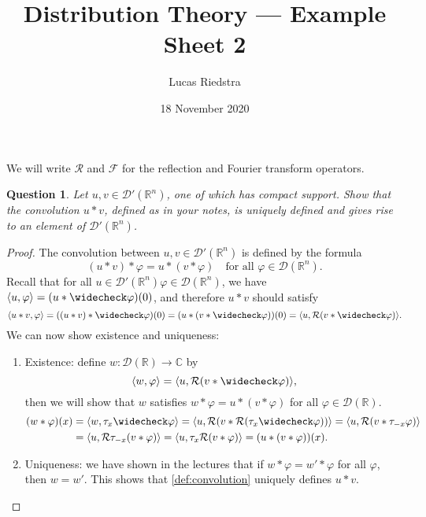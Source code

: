 \documentclass{article}
\title{Distribution Theory --- Example Sheet 2} %
\author{Lucas Riedstra}
\date{18 November 2020} %
\theoremstyle{plain}
\newtheorem{question}{Question}
\theoremstyle{remark}
\renewcommand{\phi}{\varphi}
\newcommand{\Bb}{\mathbb}
\newcommand{\Cal}{\mathcal}
\newcommand{\CC}{\Bb C}
\newcommand{\RR}{\Bb R}
\newcommand{\DD}{\Cal D}
\newcommand\FF{\Cal F}
\newcommand\Rr{\Cal R}
\DeclarePairedDelimiter{\ang}{\langle}{\rangle}
\newcommand\refl\widecheck
\begin{document}
\maketitle

\begin{mdframed}
	We will write $\Rr$ and $\FF$ for the reflection and Fourier transform operators. 
\end{mdframed}
\begin{question}
Let $u, v \in \DD'(\RR^n)$, one of which has compact support. Show that the convolution $u * v$, defined as in your notes, is uniquely defined and gives rise to an element of $\DD'(\RR^n)$. 
\end{question}

\begin{proof}
	The convolution between $u, v \in \DD'(\RR^n)$ is defined by the formula
	\begin{equation} \label{def:convolution}
	(u * v) * \phi = u * (v * \phi) \quad\text{for all $\phi \in \DD(\RR^n)$}. 
	\end{equation}
Recall that for all $u \in \DD'(\RR^n) \phi\in \DD(\RR^n)$, we have $\ang{u, \phi} = (u * \refl\phi)(0)$, and therefore $u * v$ should satisfy
\[
\ang{u * v, \phi} = ((u * v) * \refl\phi)(0) = (u * (v * \refl\phi))(0) = \ang{u, \Rr(v * \refl\phi)}. 
\] 
We can now show existence and uniqueness:
\begin{enumerate}
	\item Existence: define $w \colon \DD(\RR) \to \CC$ by 
	\[
	\ang{w, \phi} = \ang{u, \Rr(v * \refl\phi)}, 
	\]
	then we will show that $w$ satisfies $w * \phi = u * (v * \phi)$ for all $\phi \in \DD(\RR)$. 
	\begin{align*}
		(w * \phi)(x) &= \ang{w, \tau_x\refl\phi} = \ang{u, \Rr(v * \Rr(\tau_x \refl\phi))} = \ang{u, \Rr(v * \tau_{-x}\phi)} \\
		&= \ang{u, \Rr \tau_{-x} (v * \phi)} = \ang{u, \tau_x \Rr(v * \phi)} = (u * (v * \phi))(x). 
	\end{align*}
\item Uniqueness: we have shown in the lectures that if $w * \phi = w' * \phi$ for all $\phi$, then $w = w'$. This shows that \cref{def:convolution} uniquely defines $u * v$. 
\end{enumerate}
	

\end{proof}
\end{document}
